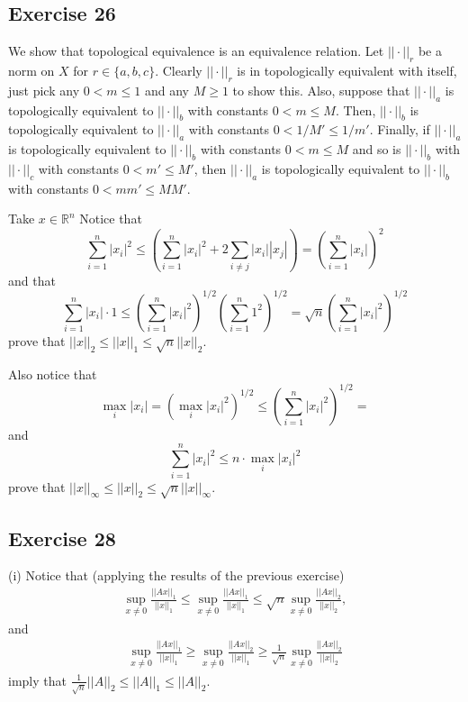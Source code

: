 \documentclass[11.5pt, letterpaper, bibtotoc,
    tablecaptionabove, figurecaptionabove]{article}
\begin{document}
\subsection*{Exercise 26}
We show that topological equivalence is an equivalence relation.
Let $||\cdot||_r$ be a norm on $X$ for $r\in\{a, b, c\}$.
Clearly $||\cdot||_r$ is in topologically equivalent with itself,
just pick any $0<m\leq 1$ and any $M\geq 1$ to show this.
Also, suppose that $||\cdot||_a$ is topologically equivalent to $||\cdot||_b$
with constants $0<m\leq M$.
Then, $||\cdot||_b$ is topologically equivalent to $||\cdot||_a$ with constants
$0<1/M'\leq 1/m'$.
Finally, if $||\cdot||_a$ is topologically equivalent to $||\cdot||_b$ with constants
$0<m\leq M$ and so is $||\cdot||_b$ with $||\cdot||_c$ with constants $0<m'\leq M'$,
then $||\cdot||_a$ is topologically equivalent to $||\cdot||_b$ with constants
$0<mm'\leq MM'$.

Take $x\in\mathbb R^n$
Notice that
\begin{equation*}
    \sum_{i=1}^n|x_i|^2\leq
    \left(\sum_{i=1}^n|x_i|^2+2\sum_{i\neq j}|x_i||x_j|\right)=
    \left(\sum_{i=1}^n|x_i|\right)^2
\end{equation*}
and that
\begin{equation*}
    \sum_{i=1}^n|x_i|\cdot1\leq
    \left(\sum_{i=1}^n|x_i|^2\right)^{1/2}\left(\sum_{i=1}^n1^2\right)^{1/2}=
    \sqrt{n}\left(\sum_{i=1}^n|x_i|^2\right)^{1/2}
\end{equation*}
prove that $||x||_2\leq||x||_1\leq\sqrt{n}||x||_2$.

Also notice that
\begin{equation*}
    \max_{i}|x_i|=\left(\max_i|x_i|^2\right)^{1/2}\leq
    \left(\sum_{i=1}^n|x_i|^2\right)^{1/2}=
\end{equation*}
and
\begin{equation*}
    \sum_{i=1}^n|x_i|^2\leq n\cdot\max_i|x_i|^2
\end{equation*}
prove that $||x||_\infty\leq||x||_2\leq \sqrt{n}||x||_\infty$.

\subsection*{Exercise 28}
(i)
Notice that (applying the results of the previous exercise)
\begin{align*}
    \sup_{x\neq 0}\frac{||Ax||_1}{||x||_1}\leq
    \sup_{x\neq 0}\frac{||Ax||_1}{||x||_1}\leq
    \sqrt{n}\sup_{x\neq 0}\frac{||Ax||_2}{||x||_2},
\end{align*}
and
\begin{align*}
    \sup_{x\neq 0}\frac{||Ax||_1}{||x||_1}\geq
    \sup_{x\neq 0}\frac{||Ax||_2}{||x||_1}\geq
    \frac{1}{\sqrt{n}}\sup_{x\neq 0}\frac{||Ax||_2}{||x||_2}
\end{align*}
imply that $\frac{1}{\sqrt{n}}||A||_2\leq||A||_1\leq||A||_2$.
\end{document}
